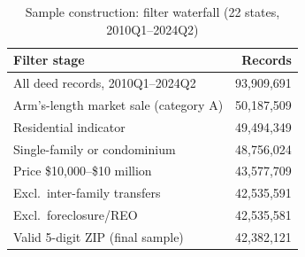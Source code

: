 \begin{table}[!htbp]\centering
\caption{Sample construction: filter waterfall (22 states, 2010Q1--2024Q2)}
\label{tab:waterfall}
\begin{tabular}{lr}
\toprule
Filter stage & Records\\
\midrule
All deed records, 2010Q1--2024Q2 & 93,909,691\\
Arm's-length market sale (category A) & 50,187,509\\
Residential indicator & 49,494,349\\
Single-family or condominium & 48,756,024\\
Price \$10{,}000--\$10 million & 43,577,709\\
Excl.\ inter-family transfers & 42,535,591\\
Excl.\ foreclosure/REO & 42,535,581\\
Valid 5-digit ZIP (final sample) & 42,382,121\\
\bottomrule
\end{tabular}
\end{table}
